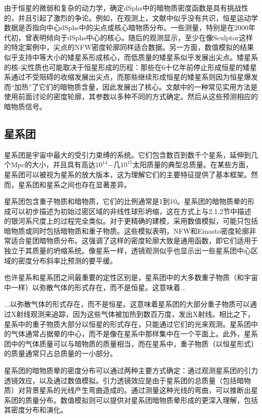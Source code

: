 由于恒星的微弱和复杂的动力学，确定dSphs中的暗物质密度函数是具有挑战性的，并且引起了激烈的争论。例如，在观测上，文献中似乎没有共识，恒星运动学数据是否指向中心dSphs中的尖点或核心暗物质分布。一些测量，特别是在2000年代初，曾表明倾向于dSphs中心的核心。随后的观测显示，至少在像Sculptor这样的特定案例中，尖点的NFW密度轮廓同样适合数据。另一方面，数值模拟的结果似乎支持中等大小的矮星系形成核心，而低质量的矮星系似乎发展出尖点。矮星系的核-尖性质也可能取决于恒星形成的历程：那些在6十亿年前停止形成恒星的矮星系通过不受阻碍的收缩发展出尖点，而那些继续形成恒星的矮星系则因为恒星爆发而“加热”了它们的暗物质含量，因此发展出了核心。文献中的一种常见实用方法是使用前面讨论的密度轮廓，其参数以多种不同的方式确定。然后从这些预测相应的暗物质信号。

\subsection{星系团}

星系团是宇宙中最大的受引力束缚的系统。它们包含数百到数千个星系，延伸到几个Mpc的大小，并且具有高达$10^{14}$−几$10^{15}$太阳质量的典型总质量。在某些方面，星系团可以被视为星系的放大版本，这为理解它们的主要特征提供了基本框架。然而，星系团和星系之间也存在显著差异。

星系团包含重子物质和暗物质，它们的比例通常是1到10。星系团的暗物质晕的形成可以初步描述为初始过密区域的非线性球形坍缩，这在方式上与2.1.2节中描述的银河系尺度上的过程完全类似。对于更精确的建模，采用数值模拟，可能只包括暗物质或同时包括暗物质和重子物质。这些模拟表明，NFW和Einasto密度轮廓非常适合星团暗物质分布。这强调了这样的密度轮廓大致是通用函数，即它们适用于独立于其质量的坍缩系统。像星系一样，透镜观测似乎也显示出一些星系团中心区域的密度分布斜率比预测的要平缓。

也许星系和星系团之间最重要的定性区别是，星系团中的大多数重子物质（和宇宙中一样）以弥散气体的形式存在，而不是恒星。这意味着...

...以弥散气体的形式存在，而不是恒星。这意味着星系团的大部分重子物质可以通过X射线观测来追踪，因为这些气体被加热到数百万度，发出X射线。相比之下，星系中的重子物质大部分以恒星的形式存在，只能通过它们的光来观测。星系团中的气体通常占据晕的中心，而不是像在星系中那样集中在一个平面上。此外，星系团中的气体质量可以与暗物质的质量相当，而在星系中，重子物质（以恒星形式）的质量通常只占总质量的一小部分。

星系团的暗物质晕的密度分布可以通过两种主要方式确定：通过观测星系团的引力透镜效应，以及通过数值模拟。引力透镜效应是由于星系团的总质量（包括暗物质）对背景星系的光线产生弯曲造成的。通过测量这种光线的弯曲，可以推断出星系团的质量分布。数值模拟则可以提供对星系团暗物质晕形成的更深入理解，包括其密度分布和演化。


